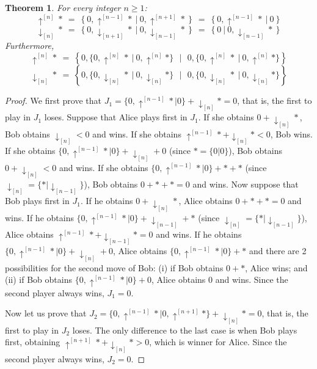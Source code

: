 \documentclass[a4paper,11pt]{article}
\newtheorem{theorem}{Theorem}
\begin{document}
\begin{theorem}\label{thm-basic2}
For every integer $n\geq 1$:
$$\uparrow^{[n]}*\ =\ \left\{0, \uparrow^{[n-1]}*\ \big|\ 0, \uparrow^{[n+1]}*\right\}\ =\ \left\{0,  \uparrow^{[n-1]}*\ \big|\ 0\right\}$$
$$\downarrow_{[n]}*\ =\ \left\{0,\downarrow_{[n+1]}*\ \big|\ 0, \downarrow_{[n-1]}*\right\}\ =\ \left\{0\ \big|\ 0, \downarrow_{[n-1]}*\right\}$$
Furthermore,
$$\uparrow^{[n]}*\ =\ \left\{0,\{0,\uparrow^{[n]}*\ |\ 0,\uparrow^{[n]}*\}\ \ \ \Big|\ \ \ 0,\{0,\uparrow^{[n]}*\ |\ 0,\uparrow^{[n]}*\}\right\}$$
$$\downarrow_{[n]}*\ =\ \left\{0,\{0,\downarrow_{[n]}*\ |\ 0,\downarrow_{[n]}*\}\ \ \ \Big|\ \ \ 0,\{0,\downarrow_{[n]}*\ |\ 0,\downarrow_{[n]}*\}\right\}$$
\end{theorem}

\begin{proof}
We first prove that $J_1=\{0,\uparrow^{[n-1]}*|0\}+\downarrow_{[n]}*=0$, that is, the first to play in $J_1$ loses.
Suppose that Alice plays first in $J_1$.
If she obtains $0+\downarrow_{[n]}*$, Bob obtains $\downarrow_{[n]}<0$ and wins.
If she obtains $\uparrow^{[n-1]}*+\downarrow_{[n]}*<0$, Bob wins.
If she obtains $\{0,\uparrow^{[n-1]}*|0\}+\downarrow_{[n]}+0$ (since $*=\{0|0\}$), Bob obtains $0+\downarrow_{[n]}<0$ and wins.
If she obtains $\{0,\uparrow^{[n-1]}*|0\}+*+*$ (since $\downarrow_{[n]}=\{*|\downarrow_{[n-1]}\}$), Bob obtains $0+*+*=0$ and wins.
Now suppose that Bob plays first in $J_1$.
If he obtains $0+\downarrow_{[n]}*$, Alice obtains $0+*+*=0$ and wins.
If he obtains $\{0,\uparrow^{[n-1]}*|0\}+\downarrow_{[n-1]}+*$ (since $\downarrow_{[n]}=\{*|\downarrow_{[n-1]}\}$), Alice obtains $\uparrow^{[n-1]}*+\downarrow_{[n-1]}*=0$ and wins.
If he obtains $\{0,\uparrow^{[n-1]}*|0\}+\downarrow_{[n]}+0$, Alice obtains $\{0,\uparrow^{[n-1]}*|0\}+*$ and there are 2 possibilities for the second move of Bob: (i) if Bob obtains $0+*$, Alice wins; and (ii) if Bob obtains $\{0,\uparrow^{[n-1]}*|0\}+0$, Alice obtains $0$ and wins. Since the second player always wins, $J_1=0$.

Now let us prove that $J_2=\{0,\uparrow^{[n-1]}*|0,\uparrow^{[n+1]}*\}+\downarrow_{[n]}*=0$, that is, the first to play in $J_2$ loses.
The only difference to the last case is when Bob plays first, obtaining $\uparrow^{[n+1]}*+\downarrow_{[n]}*>0$, which is winner for Alice. Since the second player always wins, $J_2=0$.


\end{proof}
\end{document}
